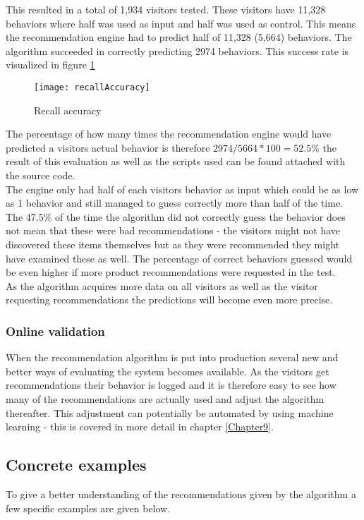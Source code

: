 This resulted in a total of 1,934 visitors tested. These visitors have 11,328 behaviors where half was used as input and half was used as control. This means the recommendation engine had to predict half of 11,328 (5,664) behaviors. The algorithm succeeded in correctly predicting 2974 behaviors. This success rate is visualized in figure \ref{recallAccuracy}   \\
\begin{figure}[H]
\centering
\texttt{[image: recallAccuracy]}
\caption{Recall accuracy}
\label{recallAccuracy}
\end{figure}
The percentage of how many times the recommendation engine would have predicted a visitors actual behavior is therefore \begin{math}2974/5664*100=52.5\%\end{math} the result of this evaluation as well as the scripts used can be found attached with the source code. \\
The engine only had half of each visitors behavior as input which could be as low as 1 behavior and still managed to guess correctly more than half of the time. The 47.5\% of the time the algorithm did not correctly guess the behavior does not mean that these were bad recommendations - the visitors might not have discovered these items themselves but as they were recommended they might have examined these as well. The percentage of correct behaviors guessed would be even higher if more product recommendations were requested in the test. \\
As the algorithm acquires more data on all visitors as well as the visitor requesting recommendations the predictions will become even more precise.

\subsubsection{Online validation}
When the recommendation algorithm is put into production several new and better ways of evaluating the system becomes available. As the visitors get recommendations their behavior is logged and it is therefore easy to see how many of the recommendations are actually used and adjust the algorithm thereafter.
This adjustment can potentially be automated by using machine learning - this is covered in more detail in chapter \ref{Chapter9}.

\subsection{Concrete examples}
To give a better understanding of the recommendations given by the algorithm a few specific examples are given below. \\

